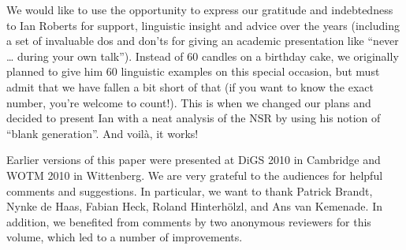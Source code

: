 \documentclass[output=paper]{langsci/langscibook}
\begin{document}
We would like to use the opportunity to express our gratitude and indebtedness
to Ian Roberts for support, linguistic insight and advice over the years (including a
set of invaluable dos and don'ts for giving an academic presentation like
``never \dots{} during your own talk''). Instead of 60 candles on a birthday
cake, we originally planned to give him 60 linguistic examples on this special
occasion, but must admit that we have fallen a bit short of that (if you want
to know the exact number, you're welcome to count!). This is when we changed
our plans and decided to present Ian with a neat analysis of the
\gls{NSR} by using his notion of ``blank
generation''. And voilà, it works!

Earlier versions of this paper were presented at DiGS 2010 in Cambridge and
WOTM 2010 in Wittenberg. We are very grateful to the audiences for helpful
comments and suggestions. In particular, we want to thank Patrick Brandt, Nynke
de Haas, Fabian Heck, Roland Hinterhölzl, and Ans van Kemenade. In addition, we
benefited from comments by two anonymous reviewers for this volume, which led
to a number of improvements.

{\sloppy
\printbibliography[heading=subbibliography,notkeyword=this]
}
\end{document}
